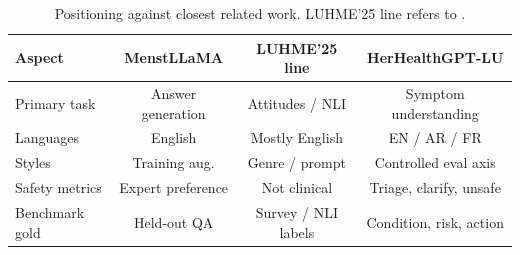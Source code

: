 \begin{table}[t]
\centering
\small
\begin{tabular}{lccc}
\hline
\textbf{Aspect} & \textbf{MenstLLaMA} & \textbf{LUHME'25 line} & \textbf{HerHealthGPT-LU} \\
\hline
Primary task & Answer generation & Attitudes / NLI & Symptom understanding \\
Languages & English & Mostly English & EN / AR / FR \\
Styles & Training aug. & Genre / prompt & Controlled eval axis \\
Safety metrics & Expert preference & Not clinical & Triage, clarify, unsafe \\
Benchmark gold & Held-out QA & Survey / NLI labels & Condition, risk, action \\
\hline
\end{tabular}
\caption{Positioning against closest related work. LUHME'25 line refers to \citet{mohammadi-etal-2025-large,nicholls-alperin-2025-cross}.}
\label{tab:positioning}
\end{table}

%   
